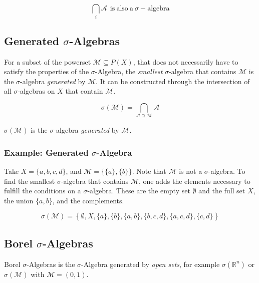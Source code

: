\begin{equation}
\bigcap_i \mathscr{A} \ \ \mathrm{is\ also\ a\ }\sigma-\mathrm{algebra}
\end{equation}


\subsection{Generated $\sigma$-Algebras}

For a subset of the powerset $\mathscr{M} \subseteq P(X)$, that does not necessarily have to satisfy the properties of the $\sigma$-Algebra, the \textit{smallest} $\sigma$-algebra that contains $\mathscr{M}$ is the $\sigma$-algebra \textit{generated} by $\mathscr{M}$. It can be constructed through the intersection of all $\sigma$-algebras  on $X$ that contain $\mathscr{M}$. 

\begin{equation}
\sigma(\mathscr{M}) = \bigcap_{\mathscr{A}\supseteq\mathscr{M}}\mathscr{A}
\end{equation}

$\sigma(\mathscr{M})$ is the $\sigma$-algebra \textit{generated} by $\mathscr{M}$. 

\subsubsection{Example: Generated $\sigma$-Algebra}

Take $X = \{a,b,c,d\}$, and $\mathscr{M} = \{ \{a\}, \{b\}\}$. Note that $\mathscr{M}$ is not a $\sigma$-algebra. To find the smallest $\sigma$-algebra that contains $\mathscr{M}$, one adds the elements necessary to fulfill the conditions on a $\sigma$-algebra. These are the empty set $\emptyset$ and the full set $X$, the union $\{a,b\}$, and the complements.

\begin{equation}
\sigma(\mathscr{M}) = \left\{ \emptyset, X, \{a\}, \{b\}, \{a,b\}, \{b,c,d\}, \{a,c,d\}, \{c,d\} \right\}
\end{equation}


\subsection{Borel $\sigma$-Algebras}

Borel $\sigma$-Algebras is the $\sigma$-Algebra generated by \textit{open sets}, for example $\sigma(\mathbb{R}^n)$ or $\sigma(\mathscr{M})$ with $\mathscr{M} = (0,1)$.

